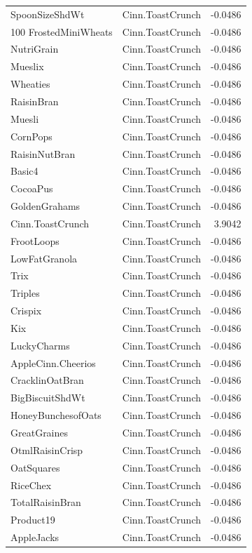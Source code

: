 \begin{longtable}{llr}
SpoonSizeShdWt & Cinn.ToastCrunch & -0.0486 \\
100%
FrostedMiniWheats & Cinn.ToastCrunch & -0.0486 \\
NutriGrain & Cinn.ToastCrunch & -0.0486 \\
Mueslix & Cinn.ToastCrunch & -0.0486 \\
Wheaties & Cinn.ToastCrunch & -0.0486 \\
RaisinBran & Cinn.ToastCrunch & -0.0486 \\
Muesli & Cinn.ToastCrunch & -0.0486 \\
CornPops & Cinn.ToastCrunch & -0.0486 \\
RaisinNutBran & Cinn.ToastCrunch & -0.0486 \\
Basic4 & Cinn.ToastCrunch & -0.0486 \\
CocoaPus & Cinn.ToastCrunch & -0.0486 \\
GoldenGrahams & Cinn.ToastCrunch & -0.0486 \\
Cinn.ToastCrunch & Cinn.ToastCrunch & 3.9042 \\
FrootLoops & Cinn.ToastCrunch & -0.0486 \\
LowFatGranola & Cinn.ToastCrunch & -0.0486 \\
Trix & Cinn.ToastCrunch & -0.0486 \\
Triples & Cinn.ToastCrunch & -0.0486 \\
Crispix & Cinn.ToastCrunch & -0.0486 \\
Kix & Cinn.ToastCrunch & -0.0486 \\
LuckyCharms & Cinn.ToastCrunch & -0.0486 \\
AppleCinn.Cheerios & Cinn.ToastCrunch & -0.0486 \\
CracklinOatBran & Cinn.ToastCrunch & -0.0486 \\
BigBiscuitShdWt & Cinn.ToastCrunch & -0.0486 \\
HoneyBunchesofOats & Cinn.ToastCrunch & -0.0486 \\
GreatGraines & Cinn.ToastCrunch & -0.0486 \\
OtmlRaisinCrisp & Cinn.ToastCrunch & -0.0486 \\
OatSquares & Cinn.ToastCrunch & -0.0486 \\
RiceChex & Cinn.ToastCrunch & -0.0486 \\
TotalRaisinBran & Cinn.ToastCrunch & -0.0486 \\
Product19 & Cinn.ToastCrunch & -0.0486 \\
AppleJacks & Cinn.ToastCrunch & -0.0486 \\

\end{longtable}
